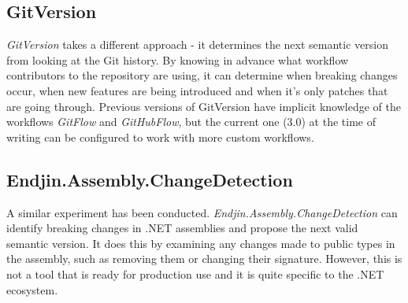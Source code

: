 \documentclass{l4proj}
\begin{document}
\subsection{GitVersion}

\textit{GitVersion}\cite{GitVersion} takes a different approach - it
determines the next semantic version from looking at the Git history.
By knowing in advance what workflow contributors to the repository are
using, it can determine when breaking changes occur, when new features
are being introduced and when it's only patches that are going
through. Previous versions of GitVersion have implicit knowledge of
the workflows \textit{GitFlow}\cite{GitFlow} and
\textit{GitHubFlow}\cite{GitHubFlow}, but the current one (3.0) at the
time of writing can be configured to work with more custom workflows.

\subsection{Endjin.Assembly.ChangeDetection}

A similar experiment has been conducted.
\textit{Endjin.Assembly.ChangeDetection}\cite{Endjin} can identify
breaking changes in .NET assemblies and propose the next valid
semantic version. It does this by examining any changes made to public
types in the assembly, such as removing them or changing their
signature. However, this is not a tool that is ready for production
use and it is quite specific to the .NET ecosystem.



\end{document}
